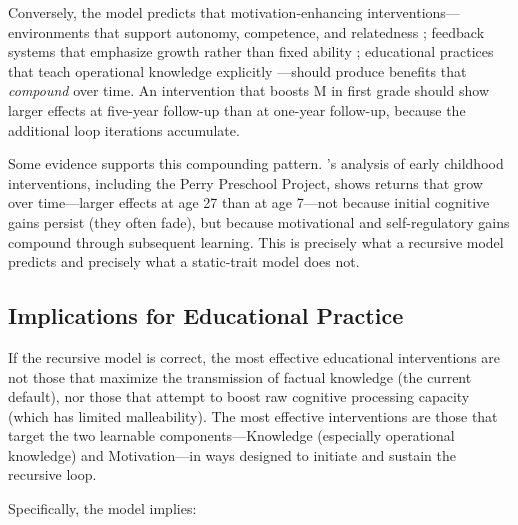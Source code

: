 \documentclass[12pt,a4paper]{article}
\begin{document}
Conversely, the model predicts that motivation-enhancing interventions---\hspace{0pt}environments that support autonomy, competence, and relatedness \citep{DeciRyan2000}; feedback systems that emphasize growth rather than fixed ability \citep{Dweck2006}; educational practices that teach operational knowledge explicitly \citep{DignathButtner2008}---\hspace{0pt}should produce benefits that \emph{compound} over time. An intervention that boosts M in first grade should show larger effects at five-year follow-up than at one-year follow-up, because the additional loop iterations accumulate.

Some evidence supports this compounding pattern. \citeauthor{Heckman2006}'s \citeyearpar{Heckman2006} analysis of early childhood interventions, including the Perry Preschool Project, shows returns that grow over time---\hspace{0pt}larger effects at age 27 than at age 7---\hspace{0pt}not because initial cognitive gains persist (they often fade), but because motivational and self-regulatory gains compound through subsequent learning. This is precisely what a recursive model predicts and precisely what a static-trait model does not.

\subsection{Implications for Educational Practice}

If the recursive model is correct, the most effective educational interventions are not those that maximize the transmission of factual knowledge (the current default), nor those that attempt to boost raw cognitive processing capacity (which has limited malleability). The most effective interventions are those that target the two learnable components---\hspace{0pt}Knowledge (especially operational knowledge) and Motivation---\hspace{0pt}in ways designed to initiate and sustain the recursive loop.

Specifically, the model implies:
\end{document}
